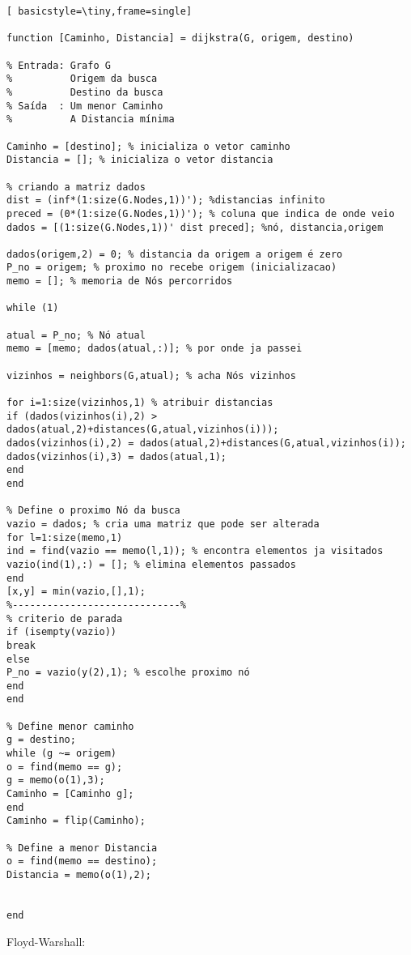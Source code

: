 \documentclass[
12pt,				%
openright,			%
oneside,			%
a4paper,			%
english,			%
french,				%
spanish,			%
brazil,				%
]{abntex2}
\begin{document}
	\begin{lstlisting}[ basicstyle=\tiny,frame=single]
	
function [Caminho, Distancia] = dijkstra(G, origem, destino)
	
% Entrada: Grafo G
%          Origem da busca
%          Destino da busca
% Saída  : Um menor Caminho
%          A Distancia mínima
	
Caminho = [destino]; % inicializa o vetor caminho
Distancia = []; % inicializa o vetor distancia
	
% criando a matriz dados
dist = (inf*(1:size(G.Nodes,1))'); %distancias infinito
preced = (0*(1:size(G.Nodes,1))'); % coluna que indica de onde veio 
dados = [(1:size(G.Nodes,1))' dist preced]; %nó, distancia,origem
	
dados(origem,2) = 0; % distancia da origem a origem é zero
P_no = origem; % proximo no recebe origem (inicializacao)
memo = []; % memoria de Nós percorridos
	
while (1)
	
atual = P_no; % Nó atual
memo = [memo; dados(atual,:)]; % por onde ja passei
	
vizinhos = neighbors(G,atual); % acha Nós vizinhos
	
for i=1:size(vizinhos,1) % atribuir distancias
if (dados(vizinhos(i),2) > dados(atual,2)+distances(G,atual,vizinhos(i)));
dados(vizinhos(i),2) = dados(atual,2)+distances(G,atual,vizinhos(i));
dados(vizinhos(i),3) = dados(atual,1);
end
end
	
% Define o proximo Nó da busca
vazio = dados; % cria uma matriz que pode ser alterada
for l=1:size(memo,1)
ind = find(vazio == memo(l,1)); % encontra elementos ja visitados
vazio(ind(1),:) = []; % elimina elementos passados
end
[x,y] = min(vazio,[],1);
%-----------------------------%
% criterio de parada
if (isempty(vazio))
break
else
P_no = vazio(y(2),1); % escolhe proximo nó
end
end
	
% Define menor caminho
g = destino;
while (g ~= origem)
o = find(memo == g);
g = memo(o(1),3);
Caminho = [Caminho g];
end
Caminho = flip(Caminho);
	
% Define a menor Distancia
o = find(memo == destino);
Distancia = memo(o(1),2);
	
	
end
	\end{lstlisting}
	
	Floyd-Warshall:
	
\end{document}
